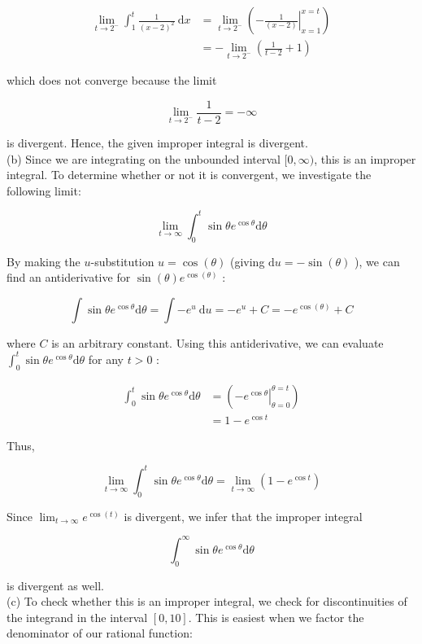 \documentclass[10pt]{article}
\begin{document}
$$
\begin{aligned}
\lim _{t \rightarrow 2^{-}} \int_{1}^{t} \frac{1}{(x-2)^{2}} \mathrm{~d} x & =\lim _{t \rightarrow 2^{-}}\left(-\left.\frac{1}{(x-2)}\right|_{x=1} ^{x=t}\right) \\
& =-\lim _{t \rightarrow 2^{-}}\left(\frac{1}{t-2}+1\right)
\end{aligned}
$$

which does not converge because the limit

$$
\lim _{t \rightarrow 2^{-}} \frac{1}{t-2}=-\infty
$$

is divergent. Hence, the given improper integral is divergent.\\
(b) Since we are integrating on the unbounded interval $[0, \infty)$, this is an improper integral. To determine whether or not it is convergent, we investigate the following limit:

$$
\lim _{t \rightarrow \infty} \int_{0}^{t} \sin \theta e^{\cos \theta} \mathrm{d} \theta
$$

By making the $u$-substitution $u=\cos (\theta)$ (giving $\mathrm{d} u=-\sin (\theta)$ ), we can find an antiderivative for $\sin (\theta) e^{\cos (\theta)}$ :

$$
\int \sin \theta e^{\cos \theta} \mathrm{d} \theta=\int-e^{u} \mathrm{~d} u=-e^{u}+C=-e^{\cos (\theta)}+C
$$

where $C$ is an arbitrary constant. Using this antiderivative, we can evaluate $\int_{0}^{t} \sin \theta e^{\cos \theta} \mathrm{d} \theta$ for any $t>0$ :

$$
\begin{aligned}
\int_{0}^{t} \sin \theta e^{\cos \theta} \mathrm{d} \theta & =\left(-\left.e^{\cos \theta}\right|_{\theta=0} ^{\theta=t}\right) \\
& =1-e^{\cos t}
\end{aligned}
$$

Thus,

$$
\lim _{t \rightarrow \infty} \int_{0}^{t} \sin \theta e^{\cos \theta} \mathrm{d} \theta=\lim _{t \rightarrow \infty}\left(1-e^{\cos t}\right)
$$

Since $\lim _{t \rightarrow \infty} e^{\cos (t)}$ is divergent, we infer that the improper integral

$$
\int_{0}^{\infty} \sin \theta e^{\cos \theta} \mathrm{d} \theta
$$

is divergent as well.\\
(c) To check whether this is an improper integral, we check for discontinuities of the integrand in the interval $[0,10]$. This is easiest when we factor the denominator of our rational function:
\end{document}
